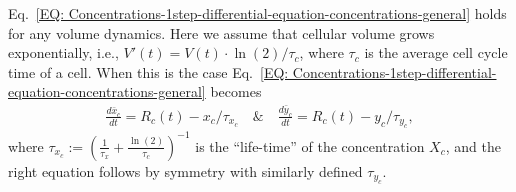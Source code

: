 \documentclass[%
 reprint,prx,
superscriptaddress,
%
%
%
%
%
%
%
%
%
 amsmath,amssymb,
 aps,
%
%
%
%
%
%
]{revtex4-2}
\begin{document}
{{Eq.~\eqref{EQ: Concentrations-1step-differential-equation-concentrations-general} holds for any volume dynamics.
Here we assume that cellular volume grows exponentially, i.e., $V'(t) = V(t)\cdot \ln(2)/\tau_{c}$, where $\tau_{c}$ is the average cell cycle time of a cell.  
When this is the case Eq.~\eqref{EQ: Concentrations-1step-differential-equation-concentrations-general} becomes 
\begin{align}
 \frac{d\bar{x}_{c}}{dt} = R_{c}(t) - x_{c}/\tau_{x_{c}} \quad \text{\&} \quad \frac{d\bar{y}_{c}}{dt} = R_{c}(t) - y_{c}/\tau_{y_{c}} ,
 \label{EQ: Concentrations-1step-differential-equation-concentrations-exponential}
\end{align}
where $\tau_{x_{c}} := \left(\frac{1}{\tau_{x}} + \frac{\ln(2)}{\tau_{c}}\right)^{-1}$ is the ``life-time'' of the concentration $X_{c}$, and the right equation follows by symmetry with similarly defined $\tau_{y_{c}}$. 
%

}}
\end{document}
